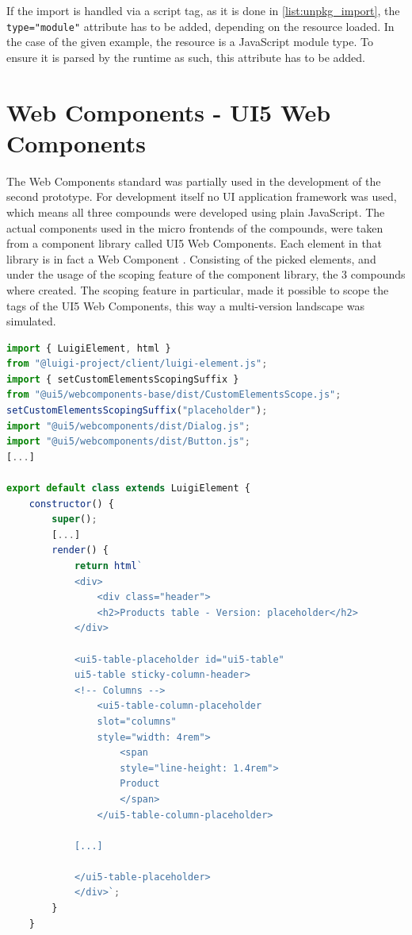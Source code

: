 If the import is handled via a script tag, as it is done in \ref{list:unpkg_import}, the \texttt{type="module"} attribute has to be added, depending on the resource loaded.
In the case of the given example, the resource is a JavaScript module type. To ensure it is parsed by the runtime as such, this attribute has to be added.\cite{js_module_type}

\section{Web Components - UI5 Web Components} 

The Web Components standard was partially used in the development of the second prototype. For development itself no UI application framework was used, which means all three compounds were developed using plain JavaScript. The actual components used in the micro frontends of the compounds, were taken from a component library called UI5 Web Components. Each element in that library is in fact a Web Component \cite{ui5_wc_github}.
Consisting of the picked elements, and under the usage of the scoping feature of the component library, the 3 compounds where created. The scoping feature in particular, made it possible to scope the tags of the UI5 Web Components, this way a multi-version landscape was simulated.\cite{ui5_webcomponents_scoping}

\begin{lstlisting}[language=JavaScript,caption=Scoping feature used in the prototype, label=list:scoping_wc_prototype,  xleftmargin=.0\textwidth, xrightmargin=.0\textwidth]
import { LuigiElement, html } 
from "@luigi-project/client/luigi-element.js";
import { setCustomElementsScopingSuffix } 
from "@ui5/webcomponents-base/dist/CustomElementsScope.js";
setCustomElementsScopingSuffix("placeholder");
import "@ui5/webcomponents/dist/Dialog.js";
import "@ui5/webcomponents/dist/Button.js";
[...]

export default class extends LuigiElement {
	constructor() {
		super();
		[...]
		render() {
			return html`
			<div>
				<div class="header">
				<h2>Products table - Version: placeholder</h2>
			</div>
			
			<ui5-table-placeholder id="ui5-table" 
			ui5-table sticky-column-header>
			<!-- Columns -->
				<ui5-table-column-placeholder 
				slot="columns" 
				style="width: 4rem">
					<span 
					style="line-height: 1.4rem">
					Product
					</span>
				</ui5-table-column-placeholder>
			
			[...]
			
			</ui5-table-placeholder>
			</div>`;
		}
	}
\end{lstlisting}
	
